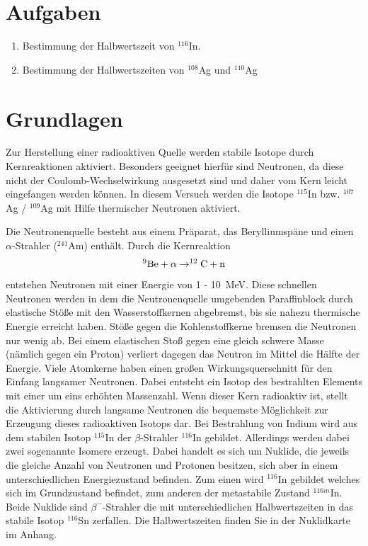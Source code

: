\documentclass[landscape,twocolumn]{article}
\begin{document}
\section{Aufgaben}
\begin{enumerate}
\item Bestimmung der Halbwertszeit von $^{116}$In.
\item Bestimmung der Halbwertszeiten von $^{108}$Ag und $^{110}$Ag
\end{enumerate}

\section{Grundlagen}


Zur Herstellung einer radioaktiven Quelle werden stabile Isotope durch Kernreaktionen aktiviert. Besonders geeignet
hierf\"{u}r sind Neutronen, da diese nicht der Coulomb-Wechselwirkung ausgesetzt sind und daher vom Kern leicht eingefangen werden k\"{o}nnen.
In diesem Versuch werden die Isotope $^{115}$In bzw. $^{107}$Ag / $^{109}$Ag mit Hilfe thermischer Neutronen aktiviert.

Die Neutronenquelle besteht aus
einem Pr\"{a}parat, das Berylliumsp\"{a}ne und einen  $\alpha$-Strahler
($^{241}$Am) enth\"{a}lt. Durch die Kernreaktion
\begin{equation}\notag
  ^{9}\text{Be} + \alpha \rightarrow ^{12}\text{C} + \text{n}
\end{equation}
entstehen Neutronen mit einer Energie von 1 - 10~MeV. Diese
schnellen Neutronen werden in dem die Neutronenquelle umgebenden
Paraffinblock durch elastische St\"{o}{\ss}e mit den Wasserstoffkernen
abgebremst, bis sie nahezu thermische Energie erreicht haben.
St\"{o}{\ss}e gegen die Kohlenstoffkerne bremsen die Neutronen nur wenig
ab. Bei einem elastischen Sto{\ss} gegen eine gleich schwere Masse
(n\"{a}mlich gegen ein Proton) verliert dagegen das Neutron im Mittel
die H\"{a}lfte der Energie. Viele Atomkerne haben einen gro{\ss}en
Wirkungsquerschnitt f\"{u}r den Einfang langsamer Neutronen. Dabei
entsteht ein Isotop des bestrahlten Elements mit einer um eins
erh\"{o}hten Massenzahl. Wenn dieser Kern radioaktiv ist, stellt die
Aktivierung durch langsame Neutronen die bequemste M\"{o}glichkeit zur
Erzeugung dieses radioaktiven Isotops dar. Bei Bestrahlung von Indium
wird aus dem stabilen Isotop $^{115}$In der $\beta$-Strahler $^{116}$In gebildet.
Allerdings werden dabei zwei sogenannte Isomere erzeugt.
Dabei handelt es sich um Nuklide, die jeweils die gleiche Anzahl von Neutronen und Protonen besitzen, sich aber in einem unterschiedlichen
Energiezustand befinden. Zum einen wird $^{116}$In gebildet welches sich im Grundzustand befindet, zum anderen
der metastabile Zustand $^{116m}$In. Beide Nuklide sind $\beta^-$-Strahler die mit unterschiedlichen Halbwertszeiten in das
stabile Isotop $^{116}$Sn zerfallen. Die Halbwertszeiten finden Sie in der Nuklidkarte im Anhang.
\end{document}
